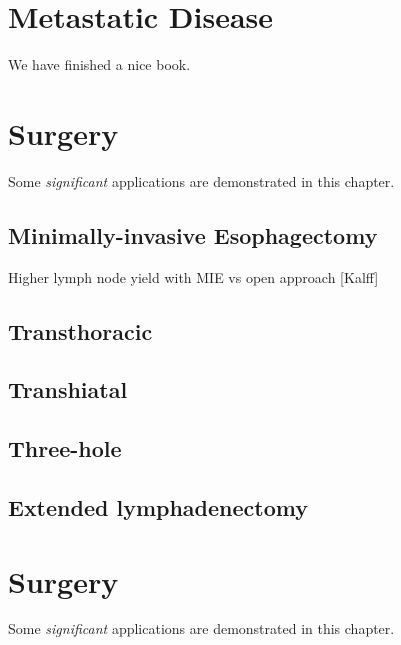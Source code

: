 \documentclass[
]{book}
\begin{document}
\hypertarget{metastatic-disease}{%
\chapter{Metastatic Disease}\label{metastatic-disease}}

We have finished a nice book.

\hypertarget{surgery-2}{%
\chapter{Surgery}\label{surgery-2}}

Some \emph{significant} applications are demonstrated in this chapter.

\hypertarget{minimally-invasive-esophagectomy-3}{%
\section{Minimally-invasive Esophagectomy}\label{minimally-invasive-esophagectomy-3}}

Higher lymph node yield with MIE vs open approach {[}Kalff{]}

\hypertarget{transthoracic-2}{%
\section{Transthoracic}\label{transthoracic-2}}

\hypertarget{transhiatal-2}{%
\section{Transhiatal}\label{transhiatal-2}}

\hypertarget{three-hole-2}{%
\section{Three-hole}\label{three-hole-2}}

\hypertarget{extended-lymphadenectomy-2}{%
\section{Extended lymphadenectomy}\label{extended-lymphadenectomy-2}}

\hypertarget{surgery-3}{%
\chapter{Surgery}\label{surgery-3}}

Some \emph{significant} applications are demonstrated in this chapter.
\end{document}
